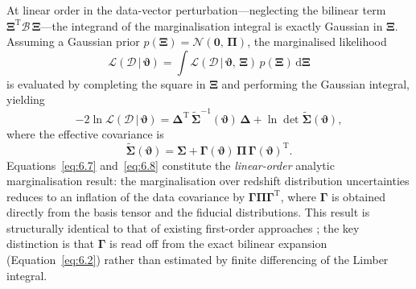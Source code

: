 At linear order in the data-vector perturbation---neglecting the bilinear term \(\boldsymbol{\Xi}^{\mathrm{T}} \boldsymbol{\mathcal{B}}\, \boldsymbol{\Xi}\)---the integrand of the marginalisation integral is exactly Gaussian in \(\boldsymbol{\Xi}\). Assuming a Gaussian prior \(p(\boldsymbol{\Xi}) = \mathcal{N}(\boldsymbol{0},\, \boldsymbol{\Pi})\), the marginalised likelihood
\begin{equation} \label{eq:6.6}
    \mathcal{L}(\boldsymbol{\mathcal{D}} \,|\, \boldsymbol{\vartheta}) = \int \mathcal{L}(\boldsymbol{\mathcal{D}} \,|\, \boldsymbol{\vartheta},\, \boldsymbol{\Xi})\, p(\boldsymbol{\Xi})\, \mathrm{d}\boldsymbol{\Xi}
\end{equation}
is evaluated by completing the square in \(\boldsymbol{\Xi}\) and performing the Gaussian integral, yielding
\begin{equation} \label{eq:6.7}
    -2\ln\mathcal{L}(\boldsymbol{\mathcal{D}} \,|\, \boldsymbol{\vartheta}) = \boldsymbol{\Delta}^{\mathrm{T}}\, \tilde{\boldsymbol{\Sigma}}^{-1}(\boldsymbol{\vartheta})\, \boldsymbol{\Delta} + \ln\det\tilde{\boldsymbol{\Sigma}}(\boldsymbol{\vartheta}),
\end{equation}
where the effective covariance is
\begin{equation} \label{eq:6.8}
    \tilde{\boldsymbol{\Sigma}}(\boldsymbol{\vartheta}) = \boldsymbol{\Sigma} + \boldsymbol{\Gamma}(\boldsymbol{\vartheta})\, \boldsymbol{\Pi}\, \boldsymbol{\Gamma}(\boldsymbol{\vartheta})^{\mathrm{T}}.
\end{equation}
Equations~\ref{eq:6.7} and~\ref{eq:6.8} constitute the \textit{linear-order} analytic marginalisation result: the marginalisation over redshift distribution uncertainties reduces to an inflation of the data covariance by \(\boldsymbol{\Gamma}\boldsymbol{\Pi}\boldsymbol{\Gamma}^{\mathrm{T}}\), where \(\boldsymbol{\Gamma}\) is obtained directly from the basis tensor and the fiducial distributions. This result is structurally identical to that of existing first-order approaches \citep{2020JCAP...10..056H, 2023MNRAS.522.5037R, 2023OJAp....6E..23H, 2025A&A...693A.178R, 2025arXiv250600758B, 2026arXiv260424425R}; the key distinction is that \(\boldsymbol{\Gamma}\) is read off from the exact bilinear expansion (Equation~\ref{eq:6.2}) rather than estimated by finite differencing of the Limber integral.

